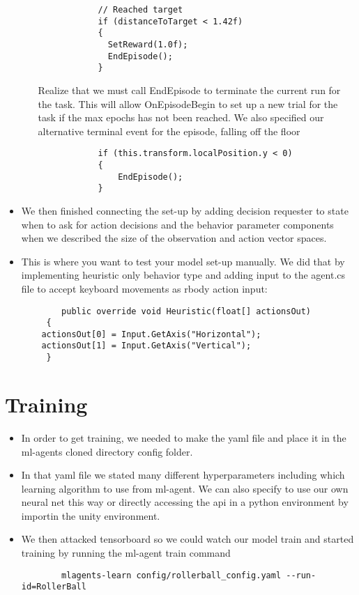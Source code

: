 \documentclass[11pt,fleqn,openany]{book} %
\begin{document}
\begin{itemize}
\begin{itemize}
\begin{verbatim}
            // Reached target
            if (distanceToTarget < 1.42f)
            {
              SetReward(1.0f);
              EndEpisode();
            }
        \end{verbatim} Realize that we must call EndEpisode to terminate the current run for the task. This will allow OnEpisodeBegin to set up a new trial for the task if the max epochs has not been reached. We also specified our alternative terminal event for the episode, falling off the floor \begin{verbatim}
            if (this.transform.localPosition.y < 0)
            {
                EndEpisode();
            }
        \end{verbatim}
    \end{itemize}
    \item We then finished connecting the set-up by adding decision requester to state when to ask for action decisions and the behavior parameter components when we described the size of the observation and action vector spaces.
    \item This is where you want to test your model set-up manually. We did that by implementing heuristic only behavior type and adding input to the agent.cs file to accept keyboard movements as rbody action input: \begin{verbatim}
        public override void Heuristic(float[] actionsOut)
     {
    actionsOut[0] = Input.GetAxis("Horizontal");
    actionsOut[1] = Input.GetAxis("Vertical");
     }
    \end{verbatim}
\end{itemize}

\section{Training}
\begin{itemize}
    \item In order to get training, we needed to make the yaml file and place it in the ml-agents cloned directory config folder.
    \item In that yaml file we stated many different hyperparameters including which learning algorithm to use from ml-agent. We can also specify to use our own neural net this way or directly accessing the api in a python environment by importin the unity environment.
    \item We then attacked tensorboard so we could watch our model train and started training by running the ml-agent train command \begin{verbatim}
        mlagents-learn config/rollerball_config.yaml --run-id=RollerBall
    \end{verbatim}
\end{itemize}
\end{document}
